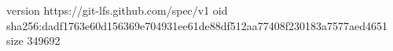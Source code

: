 version https://git-lfs.github.com/spec/v1
oid sha256:dadf1763e60d156369e704931ee61de88df512aa77408f230183a7577aed4651
size 349692
